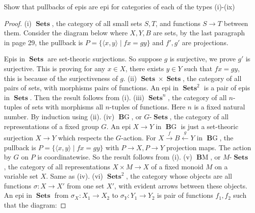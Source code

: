 \documentclass[a4paper]{article}
\title{\hmwkTitle}
\author{\textbf{\hmwkAuthorName}}
\date{\hmwkDueDate}
\DeclareMathOperator{\Sets}{\mathbf {Sets}}
\DeclareMathOperator{\BG}{\mathbf BG}
\DeclareMathOperator{\BM}{\mathbf BM}
\begin{document}
\begin{titlepage}
    \maketitle
\end{titlepage}
\begin{question}
    Show that pullbacks of epis are epi for categories of each of the types (i)-(ix)
    \begin{proof}

        (i) $\Sets$, the category of all small sets $S,T$, and functions $S\to T$ between them.\newline
        Consider the diagram below where $X,Y, B$ are sets, by the last paragraph in page 29, the pullback is $P=\{\langle x,y\rangle\mid fx = gy\}$ and $f',g'$ are projections. 
        \begin{center}
        \end{center}
        Epis in $\Sets$ are set-theoric surjections. So suppose $g$ is surjective, we prove $g'$ is surjective. This is proving for any $x\in X$, there exists $y\in Y$ such that $fx = gy$, this is because of the surjectiveness of $g$.
        \newline
        (ii) $\Sets \times \Sets$, the category of all pairs of sets, with morphisms pairs of functions.
        \newline
        An epi in $\Sets^2$ is a pair of epis in $\Sets$. Then the result follows from (i).\newline
        (iii) $\Sets^n$, the category of all $n$-tuples of sets with morphisms all $n$-tuples of functions. Here $n$ is a fixed natural number.\newline
        By induction using (ii).\newline
        (iv) $\BG$, or $G$-$\Sets$, the category of all representations of a fixed group $G$.\newline
        An epi $X\to Y$ in $\BG$ is just a set-theoric surjection $X\to Y$ which respects the $G$-action.
        For $X\overset{f}\rightarrow B\overset{g}\leftarrow Y$ in $\BG$, the pullback is $P=\{\langle x,y\rangle\mid fx = gy\}$ with $P\to X,P\to Y$ projection maps. The action by $G$ on $P$ is coordinatewise. So the result follows from (i).\newline
        (v) $\BM$, or $M$-$\Sets$, the category of all representations $X\times M\to X$ of a fixed monoid $M$ on a variable set $X$.\newline
        Same as (iv).\newline
        (vi) $\Sets^2$, the category whose objects are all functions $\sigma:X\to X'$ from one set $X'$, with evident arrows between these objects.\newline
        An epi in $\Sets$ from $\sigma_X:X_1\to X_2$ to $\sigma_Y:Y_1\to Y_2$ is pair of functions $f_1,f_2$ such that the diagram:


\end{proof}
\end{question}
\end{document}
